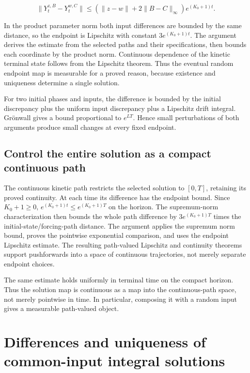 \documentclass[11pt,a4paper]{report}
\begin{document}
\[\|Y_t^{z,B}-Y_t^{w,C}\|\le(\|z-w\|+2\|B-C\|_\infty)e^{(K_0+1)t}.\]

In the product parameter norm both input differences are bounded by the same distance, so the endpoint is Lipschitz with constant \(3e^{(K_0+1)t}\). The argument derives the estimate from the selected paths and their specifications, then bounds each coordinate by the product norm. Continuous dependence of the kinetic terminal state follows from the Lipschitz theorem. Thus the eventual random endpoint map is measurable for a proved reason, because existence and uniqueness determine a single solution.



For two initial phases and inputs, the difference is bounded by the initial discrepancy plus the uniform input discrepancy plus a Lipschitz drift integral. Grönwall gives a bound proportional to \(e^{LT}\). Hence small perturbations of both arguments produce small changes at every fixed endpoint.

\subsection{\texorpdfstring{Control the entire solution as a compact continuous path}{Control the entire solution as a compact continuous path}}
\label{report-step-KineticLangevin-Flow-lean-5}


The continuous kinetic path restricts the selected solution to \([0,T]\), retaining its proved continuity. At each time its difference has the endpoint bound. Since \(K_0+1\ge0\), \(e^{(K_0+1)t}\le e^{(K_0+1)T}\) on the horizon. The supremum-norm characterization then bounds the whole path difference by \(3e^{(K_0+1)T}\) times the initial-state/\allowbreak{}forcing-path distance. The argument applies the supremum norm bound, proves the pointwise exponential comparison, and uses the endpoint Lipschitz estimate. The resulting path-valued Lipschitz and continuity theorems support pushforwards into a space of continuous trajectories, not merely separate endpoint choices.



The same estimate holds uniformly in terminal time on the compact horizon. Thus the solution map is continuous as a map into the continuous-path space, not merely pointwise in time. In particular, composing it with a random input gives a measurable path-valued object.

\section{\texorpdfstring{Differences and uniqueness of common-input integral solutions}{Differences and uniqueness of common-input integral solutions}}
\label{proof-module-KineticLangevin-IntegralCoupling-lean}
\end{document}
